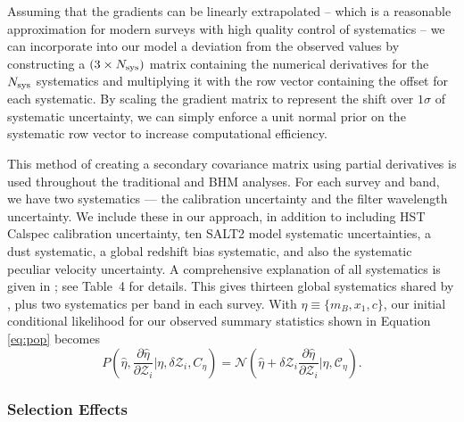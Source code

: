 \documentclass[twocolumn,trackchanges,tighten]{aastex62}
\newcommand{\cov}{\mathcal{C}_\eta}
\newcommand{\Z}{\mathcal{Z}}
\begin{document}
Assuming that the gradients can be linearly extrapolated -- which is a reasonable approximation for modern surveys with high quality control of systematics -- we can incorporate into our model a deviation from the observed values by constructing a $(3 \times N_{\rm sys})$ matrix containing the numerical derivatives for the $N_{\rm sys}$ systematics and multiplying it with the row vector containing the offset for each systematic. By scaling the gradient matrix to represent the shift over $1\sigma$ of systematic uncertainty, we can simply enforce a unit normal prior on the systematic row vector to increase computational efficiency.

This method of creating a secondary covariance matrix using partial derivatives is used throughout the traditional and BHM analyses. For each survey and band, we have two systematics --- the calibration uncertainty and the filter wavelength uncertainty. We include these in our approach, in addition to including HST Calspec calibration uncertainty, ten SALT2 model systematic uncertainties, a dust systematic, a global redshift bias systematic, and also the systematic peculiar velocity uncertainty. A comprehensive explanation of all systematics is given in \citet{Brout18SYS}; see Table~4 for details. This gives thirteen global systematics shared by , plus two systematics per band in each survey.  With $\eta \equiv \lbrace m_B, x_1, c \rbrace$, our initial conditional likelihood for our observed summary statistics shown in Equation \eqref{eq:pop} becomes
\begin{equation}
P\left(\hat{\eta}, \frac{\partial \hat{\eta}}{\partial \Z_i} | \eta, \delta \Z_i, C_\eta\right) = \mathcal{N}\left(\hat{\eta} + \delta \Z_i \frac{\partial \hat{\eta}}{\partial \Z_i}|\eta,\cov\right). \label{eq:l3}
\end{equation}




\subsubsection{Selection Effects}
\label{sec:selection}
\end{document}
